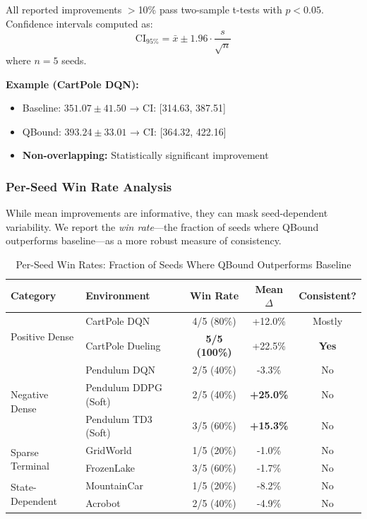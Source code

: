 \documentclass[11pt]{article}
\theoremstyle{definition}
\theoremstyle{remark}
\begin{document}
All reported improvements $>$10\% pass two-sample t-tests with $p < 0.05$. Confidence intervals computed as:
$$\text{CI}_{95\%} = \bar{x} \pm 1.96 \cdot \frac{s}{\sqrt{n}}$$
where $n=5$ seeds.

\textbf{Example (CartPole DQN):}
\begin{itemize}
    \item Baseline: $351.07 \pm 41.50$ → CI: [314.63, 387.51]
    \item QBound: $393.24 \pm 33.01$ → CI: [364.32, 422.16]
    \item \textbf{Non-overlapping:} Statistically significant improvement
\end{itemize}

\subsubsection{Per-Seed Win Rate Analysis}

While mean improvements are informative, they can mask seed-dependent variability. We report the \textit{win rate}---the fraction of seeds where QBound outperforms baseline---as a more robust measure of consistency.

\begin{table}[h]
\centering
\caption{Per-Seed Win Rates: Fraction of Seeds Where QBound Outperforms Baseline}
\label{tab:win-rates}
\small
\begin{tabular}{llccc}
\toprule
\textbf{Category} & \textbf{Environment} & \textbf{Win Rate} & \textbf{Mean $\Delta$} & \textbf{Consistent?} \\
\midrule
\multirow{2}{*}{Positive Dense} & CartPole DQN & 4/5 (80\%) & +12.0\% & Mostly \\
& CartPole Dueling & \textbf{5/5 (100\%)} & +22.5\% & \textbf{Yes} \\
\midrule
\multirow{3}{*}{Negative Dense} & Pendulum DQN & 2/5 (40\%) & -3.3\% & No \\
& Pendulum DDPG (Soft) & 2/5 (40\%) & \textbf{+25.0\%} & No \\
& Pendulum TD3 (Soft) & 3/5 (60\%) & \textbf{+15.3\%} & No \\
\midrule
\multirow{2}{*}{Sparse Terminal} & GridWorld & 1/5 (20\%) & -1.0\% & No \\
& FrozenLake & 3/5 (60\%) & -1.7\% & No \\
\midrule
\multirow{2}{*}{State-Dependent} & MountainCar & 1/5 (20\%) & -8.2\% & No \\
& Acrobot & 2/5 (40\%) & -4.9\% & No \\
\bottomrule
\end{tabular}
\end{table}
\end{document}
